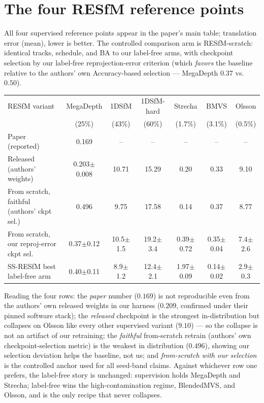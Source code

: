 \documentclass[11pt]{article}
\begin{document}
\section*{The four RESfM reference points}

All four supervised reference points appear in the paper's main table; translation
error (mean), lower is better. The controlled comparison arm is RESfM-scratch:
identical tracks, schedule, and BA to our label-free arms, with checkpoint selection by
our label-free reprojection-error criterion (which \emph{favors} the baseline relative
to the authors' own Accuracy-based selection --- MegaDepth $0.37$ vs.\ $0.50$).

\begin{center}
\small
\begin{tabular}{lcccccc}
\toprule
RESfM variant & MegaDepth & 1DSfM & 1DSfM-hard & Strecha & BMVS & Olsson\\
 & (25\%) & (43\%) & (60\%) & (1.7\%) & (3.1\%) & (0.5\%)\\
\midrule
Paper (reported)              & 0.169 & -- & -- & -- & -- & --\\
Released (authors' weights)   & 0.203$\pm$0.008 & 10.71 & 15.29 & 0.20 & 0.33 & 9.10\\
From scratch, faithful (authors' ckpt sel.) & 0.496 & 9.75 & 17.58 & 0.14 & 0.37 & 8.77\\
From scratch, our reproj-error ckpt sel.    & 0.37$\pm$0.12 & 10.5$\pm$1.5 & 19.2$\pm$3.4 & 0.39$\pm$0.72 & 0.35$\pm$0.04 & 7.4$\pm$2.6\\
\midrule
SS-RESfM best label-free arm  & 0.40$\pm$0.11 & 8.9$\pm$1.2 & 12.4$\pm$2.1 & 1.97$\pm$0.09 & 0.14$\pm$0.02 & 2.9$\pm$0.3\\
\bottomrule
\end{tabular}
\end{center}

Reading the four rows: the \emph{paper} number ($0.169$) is not reproducible even from
the authors' own released weights in our harness ($0.209$, confirmed under their pinned
software stack); the \emph{released} checkpoint is the strongest in-distribution but
collapses on Olsson like every other supervised variant ($9.10$) --- so the collapse is
not an artifact of our retraining; the \emph{faithful} from-scratch retrain (authors'
own checkpoint-selection metric) is the weakest in distribution ($0.496$), showing our
selection deviation helps the baseline, not us; and \emph{from-scratch with our
selection} is the controlled anchor used for all seed-band claims. Against whichever
row one prefers, the label-free story is unchanged: supervision holds MegaDepth and
Strecha; label-free wins the high-contamination regime, BlendedMVS, and Olsson, and is
the only recipe that never collapses.
\end{document}
